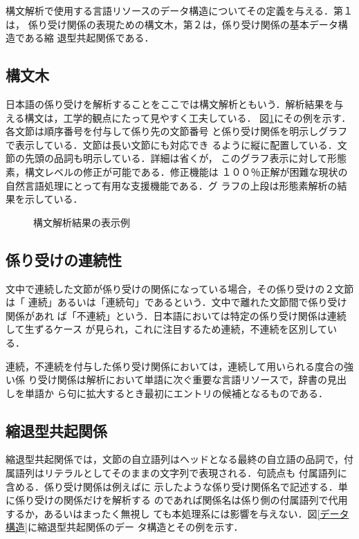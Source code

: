 構文解析で使用する言語リソースのデータ構造についてその定義を与える．第１は，
係り受け関係の表現ための構文木，第２は，係り受け関係の基本データ構造である縮
退型共起関係である．

\subsection{構文木}

日本語の係り受けを解析することをここでは構文解析ともいう．解析結果を与
える構文は，工学的観点にたって見やすく工夫している．
図\ref{構文解析結果の表示例}にその例を示す．
各文節は順序番号を付与して係り先の文節番号
と係り受け関係を明示しグラフで表示している．文節は長い文節にも対応でき
るように縦に配置している．文節の先頭の品詞も明示している．詳細は省くが，
このグラフ表示に対して形態素，構文レベルの修正が可能である．修正機能は
１００％正解が困難な現状の自然言語処理にとって有用な支援機能である．グ
ラフの上段は形態素解析の結果を示している．

\begin{figure}[htb]
\begin{center}

\caption{構文解析結果の表示例} \label{構文解析結果の表示例}
\end{center}
\end{figure}

\subsection{係り受けの連続性}

文中で連続した文節が係り受けの関係になっている場合，その係り受けの２文節は「
連続」あるいは「連続句」であるという．文中で離れた文節間で係り受け関係があれ
ば「不連続」という．日本語においては特定の係り受け関係は連続して生ずるケース
が見られ，これに注目するため連続，不連続を区別している．

連続，不連続を付与した係り受け関係においては，連続して用いられる度合の強い係
り受け関係は解析において単語に次ぐ重要な言語リソースで，辞書の見出しを単語か
ら句に拡大するとき最初にエントリの候補となるものである．

\subsection{縮退型共起関係}

縮退型共起関係では，文節の自立語列はヘッドとなる最終の自立語の品詞で，付
属語列はリテラルとしてそのままの文字列で表現される．句読点も
付属語列に含める．係り受け関係は例えば\cite{YamagamiAndYasuhara1993}に
示したような係り受け関係名で記述する．単に係り受けの関係だけを解析する
のであれば関係名は係り側の付属語列で代用するか，あるいはまったく無視し
ても本処理系には影響を与えない．図\ref{データ構造}に縮退型共起関係のデー
タ構造とその例を示す．
\vspace*{5mm}

